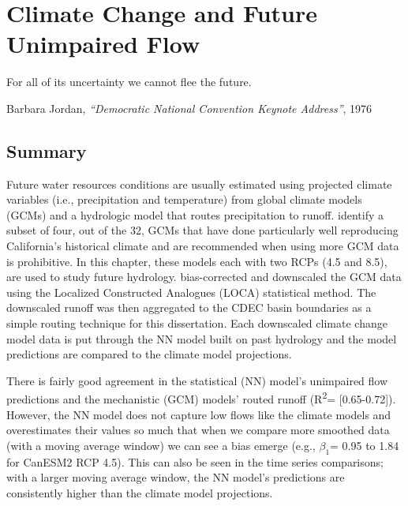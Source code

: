 \chapter[Climate Change]{Climate Change and Future Unimpaired Flow} \label{ch5:climatechange}
\setlength{\epigraphwidth}{5.5in}
\epigraph{For all of its uncertainty we cannot flee the future.}{Barbara Jordan, \textit{``Democratic National Convention Keynote Address''}, 1976}

\section*{Summary}
Future water resources conditions are usually estimated using projected climate variables (i.e., precipitation and temperature) from global climate models (GCMs) and a hydrologic model that routes precipitation to runoff.  identify a subset of four, out of the 32, GCMs that have done particularly well reproducing California's historical climate and are recommended when using more GCM data is prohibitive. In this chapter, these models each with two RCPs (4.5 and 8.5), are used to study future hydrology.  bias-corrected and downscaled the GCM data using the Localized Constructed Analogues (LOCA) statistical method. The downscaled runoff was then aggregated to the CDEC basin boundaries as a simple routing technique for this dissertation. Each downscaled climate change model data is put through the NN model built on past hydrology and the model predictions are compared to the climate model projections. 

There is fairly good agreement in the statistical (NN) model's unimpaired flow predictions and the mechanistic (GCM) models' routed runoff (R\textsuperscript{2}= [0.65-0.72]). However, the NN model does not capture low flows like the climate models and overestimates their values so much that when we compare more smoothed data (with a moving average window) we can see a bias emerge (e.g., $\beta_1$= 0.95 to 1.84 for CanESM2 RCP 4.5). This can also be seen in the time series comparisons; with a larger moving average window, the NN model's predictions are consistently higher than the climate model projections. 

